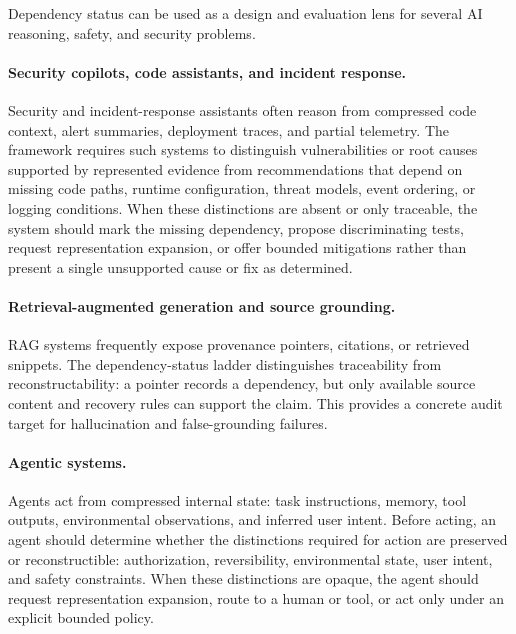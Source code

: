 \documentclass[11pt]{article}
\begin{document}
Dependency status can be used as a design and evaluation lens for several AI reasoning, safety, and security problems.

\paragraph{Security copilots, code assistants, and incident response.}
Security and incident-response assistants often reason from compressed code context, alert summaries, deployment traces, and partial telemetry. The framework requires such systems to distinguish vulnerabilities or root causes supported by represented evidence from recommendations that depend on missing code paths, runtime configuration, threat models, event ordering, or logging conditions. When these distinctions are absent or only traceable, the system should mark the missing dependency, propose discriminating tests, request representation expansion, or offer bounded mitigations rather than present a single unsupported cause or fix as determined.

\paragraph{Retrieval-augmented generation and source grounding.}
RAG systems frequently expose provenance pointers, citations, or retrieved snippets. The dependency-status ladder distinguishes traceability from reconstructability: a pointer records a dependency, but only available source content and recovery rules can support the claim. This provides a concrete audit target for hallucination and false-grounding failures.

\paragraph{Agentic systems.}
Agents act from compressed internal state: task instructions, memory, tool outputs, environmental observations, and inferred user intent. Before acting, an agent should determine whether the distinctions required for action are preserved or reconstructible: authorization, reversibility, environmental state, user intent, and safety constraints. When these distinctions are opaque, the agent should request representation expansion, route to a human or tool, or act only under an explicit bounded policy.
\end{document}
